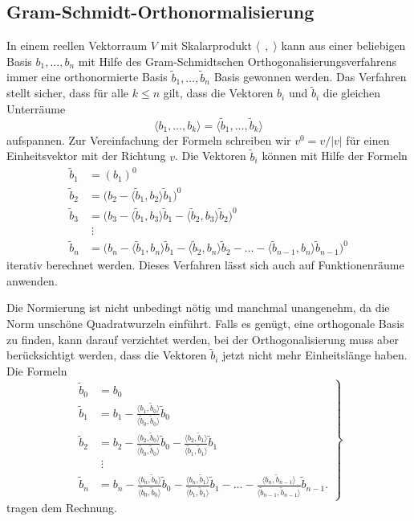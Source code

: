 \subsection{Gram-Schmidt-Orthonormalisierung}
%
In einem reellen Vektorraum $V$ mit Skalarprodukt $\langle\;\,,\;\rangle$
kann aus einer beliebigen Basis $b_1,\dots,b_n$ mit Hilfe des 
Gram-Schmidtschen Orthogonalisierungsverfahrens immer eine
orthonormierte Basis $\tilde{b}_1,\dots,\tilde{b}_n$ Basis
gewonnen werden.
Das Verfahren stellt sicher, dass für alle $k\le n$ gilt,
dass die Vektoren $b_i$ und $\tilde{b}_i$ die gleichen Unterräume
\[
\langle b_1,\dots,b_k\rangle
=
\langle \tilde{b}_1,\dots,\tilde{b}_k\rangle
\]
aufspannen.
Zur Vereinfachung der Formeln schreiben wir $v^0=v/|v|$ für einen
Einheitsvektor mit der Richtung $v$.
Die Vektoren $\tilde{b}_i$ können mit Hilfe der Formeln
\begin{align*}
\tilde{b}_1
&=
(b_1)^0
\\
\tilde{b}_2
&=
\bigl(
b_2
-
\langle \tilde{b}_1,b_2\rangle \tilde{b}_1
\bigr)^0
\\
\tilde{b}_3
&=
\bigl(
b_3
-
\langle \tilde{b}_1,b_3\rangle \tilde{b}_1
-
\langle \tilde{b}_2,b_3\rangle \tilde{b}_2
\bigr)^0
\\
&\;\vdots
\\
\tilde{b}_n
&=
\bigl(
b_n
-
\langle \tilde{b}_1,b_n\rangle \tilde{b}_1
-
\langle \tilde{b}_2,b_n\rangle \tilde{b}_2
-\dots
-
\langle \tilde{b}_{n-1},b_n\rangle \tilde{b}_{n-1}
\bigr)^0
\end{align*}
iterativ berechnet werden.
Dieses Verfahren lässt sich auch auf Funktionenräume anwenden.

Die Normierung ist nicht unbedingt nötig und manchmal unangenehm,
da die Norm unschöne Quadratwurzeln einführt.
Falls es genügt, eine orthogonale Basis zu finden, kann darauf
verzichtet werden, bei der Orthogonalisierung muss aber berücksichtigt
werden, dass die Vektoren $\tilde{b}_i$ jetzt nicht mehr Einheitslänge
haben.
Die Formeln
\begin{equation}
\left.
\begin{aligned}
\tilde{b}_0
&=
b_0
\\
\tilde{b}_1
&=
b_1
-
\frac{\langle b_1,\tilde{b}_0\rangle}{\langle \tilde{b}_0,\tilde{b}_0\rangle}\tilde{b}_0
\\
\tilde{b}_2
&=
b_2
-
\frac{\langle b_2,\tilde{b}_0\rangle}{\langle \tilde{b}_0,\tilde{b}_0\rangle}\tilde{b}_0
-
\frac{\langle b_2,\tilde{b}_1\rangle}{\langle \tilde{b}_1,\tilde{b}_1\rangle}\tilde{b}_1
\\
&\;\vdots
\\
\tilde{b}_n
&=
b_n
-
\frac{\langle b_n,\tilde{b}_0\rangle}{\langle \tilde{b}_0,\tilde{b}_0\rangle}\tilde{b}_0
-
\frac{\langle b_n,\tilde{b}_1\rangle}{\langle \tilde{b}_1,\tilde{b}_1\rangle}\tilde{b}_1
-
\dots
-
\frac{\langle b_n,\tilde{b}_{n-1}\rangle}{\langle \tilde{b}_{n-1},\tilde{b}_{n-1}\rangle}\tilde{b}_{n-1}.
\end{aligned}
\right\}
\label{buch:orthogonal:eqn:orthogonalisierung}
\end{equation}
tragen dem Rechnung.

